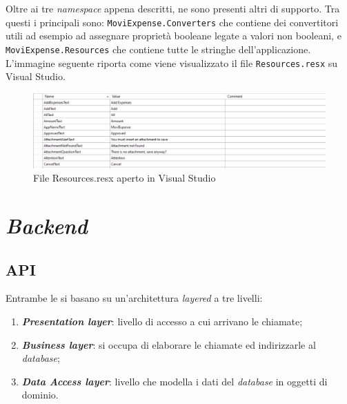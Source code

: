 \vspace{1.5cm}

\noindent Oltre ai tre \textit{namespace} appena descritti, ne sono presenti altri di supporto. Tra questi i principali sono: \texttt{MoviExpense.Converters} che contiene dei convertitori utili ad esempio ad assegnare proprietà booleane legate a valori non booleani, e \texttt{MoviExpense.Resources} che contiene tutte le stringhe dell'applicazione. L'immagine seguente riporta come viene visualizzato il file \texttt{Resources.resx} su Visual Studio.

\begin{figure}[H]
    \centering
    \includegraphics[width=\columnwidth]{images/resources.png}
    \caption{File Resources.resx aperto in Visual Studio}
\end{figure}



\section{\textit{Backend}}

\subsection{API}

Entrambe le  si basano su un'architettura \textit{layered} a tre livelli:
\begin{enumerate}
    \item \textit{\textbf{Presentation layer}}: livello di accesso a cui arrivano le chiamate;
    \item \textit{\textbf{Business layer}}: si occupa di elaborare le chiamate ed indirizzarle al \textit{database};
    \item \textit{\textbf{Data Access layer}}: livello che modella i dati del \textit{database} in oggetti di dominio.
\end{enumerate}

